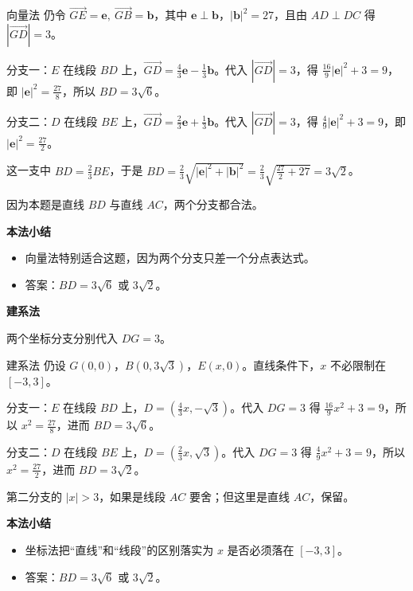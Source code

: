 \documentclass{exam-zh}
\newenvironment{eduSubQuestionItem}[1]{%
  \needspace{4\baselineskip}%
  \vspace{2mm}
  \par\noindent
  \hangindent=8mm\hangafter=1
  {\color{edu-blue}\bfseries #1}\enspace
  \begingroup
  \color{edu-ink}
}{%
  \endgroup
  \par
  \vspace{3mm}
}
\newenvironment{eduBulletList}{%
  \begin{itemize}[
    label=\textbullet,
    leftmargin=5mm,
    itemsep=1.2mm,
    topsep=0pt,
    parsep=0pt
  ]
}{%
  \end{itemize}
}
\begin{document}
\begin{eduSolutionBox}{向量法}
  \begingroup
  \setlength{\parskip}{2.5mm}
仍令 $\vec{GE}=\mathbf e,\ \vec{GB}=\mathbf b$，其中 $\mathbf e\perp\mathbf b$，$|\mathbf b|^2=27$，且由 $AD\perp DC$ 得 $|\vec{GD}|=3$。\par
分支一：$E$ 在线段 $BD$ 上，$\vec{GD}=\frac43\mathbf e-\frac13\mathbf b$。代入 $|\vec{GD}|=3$，得 $\frac{16}{9}|\mathbf e|^2+3=9$，即 $|\mathbf e|^2=\frac{27}{8}$，所以 $BD=3\sqrt6$。\par
分支二：$D$ 在线段 $BE$ 上，$\vec{GD}=\frac23\mathbf e+\frac13\mathbf b$。代入 $|\vec{GD}|=3$，得 $\frac49|\mathbf e|^2+3=9$，即 $|\mathbf e|^2=\frac{27}{2}$。\par
这一支中 $BD=\frac23BE$，于是 $BD=\frac23\sqrt{|\mathbf e|^2+|\mathbf b|^2}=\frac23\sqrt{\frac{27}{2}+27}=3\sqrt2$。\par
因为本题是直线 $BD$ 与直线 $AC$，两个分支都合法。\par
  \endgroup
  \vspace{2.5mm}
  {\color{edu-blue}\bfseries\small 本法小结}\par\vspace{1.5mm}
  \begin{eduBulletList}
    \item 向量法特别适合这题，因为两个分支只差一个分点表达式。    \item 答案：$BD=3\sqrt6$ 或 $3\sqrt2$。  \end{eduBulletList}
\end{eduSolutionBox}




\begin{eduSubQuestionItem}{建系法}
两个坐标分支分别代入 $DG=3$。\end{eduSubQuestionItem}

\begin{eduSolutionBox}{建系法}
  \begingroup
  \setlength{\parskip}{2.5mm}
仍设 $G(0,0)$，$B(0,3\sqrt3)$，$E(x,0)$。直线条件下，$x$ 不必限制在 $[-3,3]$。\par
分支一：$E$ 在线段 $BD$ 上，$D=(\frac43x,-\sqrt3)$。代入 $DG=3$ 得 $\frac{16}{9}x^2+3=9$，所以 $x^2=\frac{27}{8}$，进而 $BD=3\sqrt6$。\par
分支二：$D$ 在线段 $BE$ 上，$D=(\frac23x,\sqrt3)$。代入 $DG=3$ 得 $\frac49x^2+3=9$，所以 $x^2=\frac{27}{2}$，进而 $BD=3\sqrt2$。\par
第二分支的 $|x|>3$，如果是线段 $AC$ 要舍；但这里是直线 $AC$，保留。\par
  \endgroup
  \vspace{2.5mm}
  {\color{edu-blue}\bfseries\small 本法小结}\par\vspace{1.5mm}
  \begin{eduBulletList}
    \item 坐标法把“直线”和“线段”的区别落实为 $x$ 是否必须落在 $[-3,3]$。    \item 答案：$BD=3\sqrt6$ 或 $3\sqrt2$。  \end{eduBulletList}
\end{eduSolutionBox}
\end{document}

